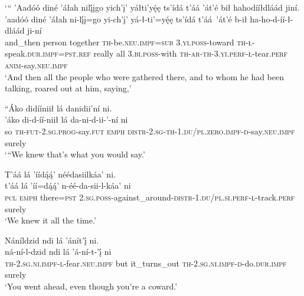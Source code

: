 \ea\label{ex:text2-22-1}
`{``} ’Aadóó diné ’áłah nilį́įgo yich’į’ yáłti’yę́ę ts’ídá t’áá ’át’é bił hahodííłdláád jiní.\\
\gll ’aadóó	diné	’áłah	ni-lį́į=go	yi-ch’į’	yá-ł-ti’=yę́ę	ts’ídá	t’áá~{’át’é}	b-ił	ha-ho-d-íí-ł-dláád	ji-ní\\
     and\_then	person	together	\textsc{th}-be.\textsc{neu}.\textsc{impf}=\textsc{sub}	3.\textsc{yi}.\textsc{poss}-toward	\textsc{th}-\textsc{ł}-speak.\textsc{dur}.\textsc{impf}=\textsc{pst}.\textsc{ref}	really	all	3.\textsc{bi}.\textsc{poss}-with	\textsc{th}-\textsc{ar}-\textsc{th}-3.\textsc{yi}.\textsc{perf}-\textsc{ł}-tear.\textsc{perf}	\textsc{anim}-say.\textsc{neu}.\textsc{impf}\\
\glt `And then all the people who were gathered there, and to whom he had been talking, roared out at him, saying,'
\z

\ea\label{ex:text2-22-2}
``Áko didííniił lá danidii’ní ni.\\
\gll ’áko	di-d-íí-niił	lá	da-ni-d-ii-’-ní	ni\\
     so	\textsc{th}-\textsc{fut}-2.\textsc{sg}.\textsc{prog}-say.\textsc{fut}	\textsc{emph}	\textsc{distr}-2.\textsc{sg}-\textsc{th}-1.\textsc{du}/\textsc{pl}.\textsc{zero}.\textsc{impf}-\textsc{d}-say.\textsc{neu}.\textsc{impf}	surely\\
\glt `{``}We knew that's what you would say.'
\z

\ea\label{ex:text2-22-3}
T’áá lá ’íídą́ą́’ néédasiilkáa’ ni.\\
\gll t’áá	lá	’íí=dą́ą́’	n-éé-da-sii-l-káa’	ni\\
     \textsc{pcl}	\textsc{emph}	there=\textsc{pst}	2.\textsc{sg}.\textsc{poss}-against\_around-\textsc{distr}-1.\textsc{du}/\textsc{pl}.\textsc{si}.\textsc{perf}-\textsc{l}-track.\textsc{perf}	surely\\
\glt `We knew it all the time.'
\z

\ea\label{ex:text2-22-4}
Náníldzid ndi lá ’ánít’į́ ni.\\
\gll ná-ní-l-dzid	ndi	lá	’á-ní-t-’į́	ni\\
     \textsc{th}-2.\textsc{sg}.\textsc{ni}.\textsc{impf}-\textsc{l}-fear.\textsc{neu}.\textsc{impf}	but	it\_turns\_out	\textsc{th}-2.\textsc{sg}.\textsc{ni}.\textsc{impf}-\textsc{d}-do.\textsc{dur}.\textsc{impf}	surely\\
\glt `You went ahead, even though you're a coward.'
\z


